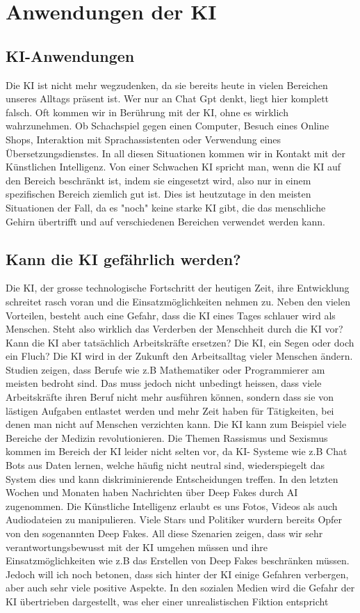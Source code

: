 \chapter{Anwendungen der KI}
\label{chap:Anwendungen}

\section{KI-Anwendungen}
Die KI ist nicht mehr wegzudenken, da sie bereits heute in vielen Bereichen unseres Alltags präsent ist. Wer nur an Chat Gpt denkt, liegt hier komplett falsch. Oft kommen wir in Berührung mit der KI, ohne es wirklich wahrzunehmen. Ob Schachspiel gegen einen Computer, Besuch eines Online Shops, Interaktion mit Sprachassistenten oder Verwendung eines Übersetzungsdienstes. In all diesen Situationen kommen wir in Kontakt mit der Künstlichen Intelligenz. Von einer Schwachen KI spricht man, wenn die KI auf den Bereich beschränkt ist, indem sie eingesetzt wird, also nur in einem spezifischen Bereich ziemlich gut ist. Dies ist heutzutage in den meisten Situationen der Fall, da es "noch" keine starke KI gibt, die das menschliche Gehirn übertrifft und auf verschiedenen Bereichen verwendet werden kann. 

\section{Kann die KI gefährlich werden?}
Die KI, der grosse technologische Fortschritt der heutigen Zeit, ihre  Entwicklung  schreitet rasch voran und die Einsatzmöglichkeiten nehmen zu. Neben den vielen Vorteilen, besteht auch eine Gefahr, dass die KI eines Tages schlauer wird als Menschen. Steht also wirklich das Verderben der Menschheit durch die KI vor? Kann die KI aber tatsächlich Arbeitskräfte ersetzen? Die KI, ein Segen oder doch ein Fluch? Die KI wird in der Zukunft den Arbeitsalltag vieler Menschen ändern. Studien zeigen, dass Berufe wie z.B Mathematiker oder Programmierer am meisten bedroht sind. Das muss jedoch nicht unbedingt heissen, dass viele Arbeitskräfte ihren Beruf nicht mehr ausführen können, sondern dass sie von lästigen Aufgaben entlastet werden und mehr Zeit haben für Tätigkeiten, bei denen man nicht auf Menschen verzichten kann. Die KI kann zum Beispiel viele Bereiche der Medizin revolutionieren. Die Themen Rassismus und Sexismus kommen im Bereich der KI leider nicht selten vor, da KI- Systeme wie z.B Chat Bots aus Daten lernen, welche häufig nicht neutral sind, wiederspiegelt das System dies und kann diskriminierende Entscheidungen treffen. In den letzten Wochen und Monaten haben Nachrichten über Deep Fakes durch AI zugenommen. Die Künstliche Intelligenz erlaubt es uns Fotos, Videos als auch Audiodateien zu manipulieren. Viele Stars und Politiker wurdern bereits Opfer von den sogenannten Deep Fakes. All diese Szenarien zeigen, dass wir sehr verantwortungsbewusst mit der KI umgehen müssen und ihre Einsatzmöglichkeiten wie z.B das Erstellen von Deep Fakes beschränken müssen. Jedoch will ich noch betonen, dass sich hinter der KI einige Gefahren verbergen, aber auch sehr viele positive Aspekte. In den sozialen Medien wird die Gefahr der KI übertrieben dargestellt, was eher einer unrealistischen Fiktion entspricht

